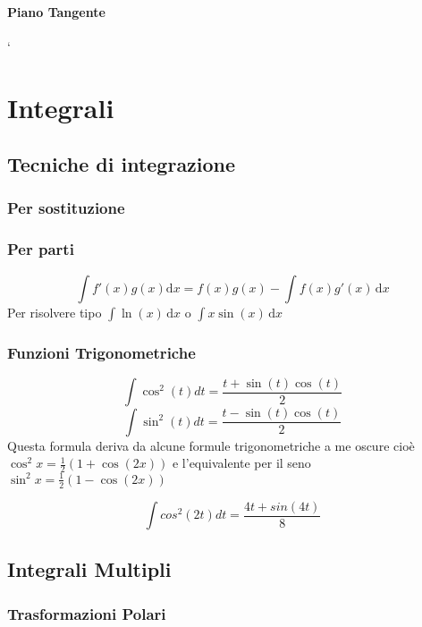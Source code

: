 \documentclass[16pt]{article}
\newcommand{\ud}{\,\mathrm{d}}
\begin{document}
\paragraph{Piano Tangente}

\begin{equation*}
\end{equation*}
`
\section{Integrali}
\subsection{Tecniche di integrazione}

\subsubsection{Per sostituzione}

\subsubsection{Per parti}
\begin{equation}
	\int f'(x) g(x) \mathrm{d}x = f(x)g(x) - \int f(x) g'(x)\ud x
\end{equation}
Per risolvere tipo $\int \ln(x) \ud x$ o $\int x \sin(x) \ud x$
\subsubsection{Funzioni Trigonometriche}

\begin{equation}
	\int \cos^2(t)dt = \frac{t+\sin(t)\cos(t)}{2}
\end{equation}
\begin{equation}
	\int \sin^2(t)dt = \frac{t-\sin(t)\cos(t)}{2}
\end{equation}
Questa formula deriva da alcune formule trigonometriche a me oscure cioè $\cos^2x = \frac{1}{2} (1+\cos(2x))$ e l'equivalente per il seno $\sin^2x=\frac{1}{2}(1-\cos(2x))$

\begin{equation}
	\int cos^2(2t)dt = \frac{4t+sin(4t)}{8}
\end{equation}

\subsection{Integrali Multipli}
\subsubsection{Trasformazioni Polari}
\end{document}
